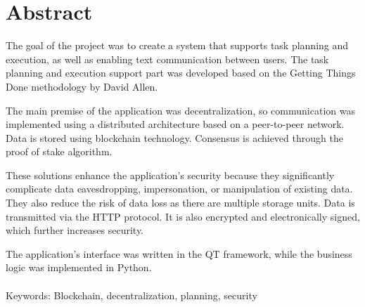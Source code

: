 \chapter*{Abstract}

The goal of the project was to create a system that supports task planning and execution, as well as enabling text communication between users. The task planning and execution support part was developed based on the Getting Things Done methodology by David Allen.

The main premise of the application was decentralization, so communication was implemented using a distributed architecture based on a peer-to-peer network. Data is stored using blockchain technology. Consensus is achieved through the proof of stake algorithm.

These solutions enhance the application's security because they significantly complicate data eavesdropping, impersonation, or manipulation of existing data. They also reduce the risk of data loss as there are multiple storage units. Data is transmitted via the HTTP protocol. It is also encrypted and electronically signed, which further increases security.

The application's interface was written in the QT framework, while the business logic was implemented in Python.
\\\\
Keywords: Blockchain, decentralization, planning, security